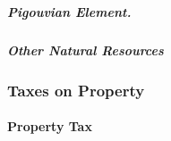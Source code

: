 



\subparagraph{Pigouvian Element.} %

\subparagraph{Other Natural Resources}




\subsubsection{Taxes on Property}

\paragraph{Property Tax}  \label{sec:PT}

